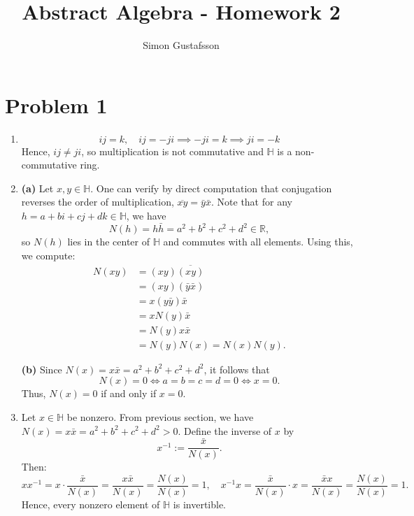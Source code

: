 \documentclass[12pt]{article}
\title{Abstract Algebra - Homework 2}
\author{Simon Gustafsson}
\date{}
\begin{document}
\maketitle

\section*{Problem 1}
\begin{enumerate}[label=(\arabic*)]
    \item    
    \[
    ij = k, \quad ij = -ji \implies -ji = k \implies ji = -k
    \]
    Hence, \( ij \neq ji \), so multiplication is not commutative and \( \mathbb{H} \) is a non-commutative ring.

    \item
    \textbf{(a)} Let \( x, y \in \mathbb{H} \). One can verify by direct computation that conjugation reverses the order of multiplication,
    \( \overline{xy} = \bar{y} \bar{x}.\)
    Note that for any \( h = a + bi + cj + dk \in \mathbb{H} \), we have
    \[
    N(h) = h\bar{h} = a^2 + b^2 + c^2 + d^2 \in \mathbb{R},
    \]
    so \( N(h) \) lies in the center of \( \mathbb{H} \) and commutes with all elements. Using this, we compute:
    \[
    \begin{aligned}
        N(xy) &= (xy)\overline{(xy)} \\
              &= (xy)(\bar{y}\bar{x}) \\
              &= x(y\bar{y})\bar{x} \\
              &= xN(y)\bar{x} \\
              &= N(y) x\bar{x} \\
              &= N(y)N(x) = N(x)N(y).
    \end{aligned}
    \]

    \textbf{(b)} Since \( N(x) = x\bar{x} = a^2 + b^2 + c^2 + d^2 \), it follows that
    \[
    N(x) = 0 \iff a = b = c = d = 0 \iff x = 0.
    \]
    Thus, \( N(x) = 0 \) if and only if \( x = 0 \).
    \item
    Let \( x \in \mathbb{H} \) be nonzero. From previous section, we have \(N(x) = x\bar{x} = a^2 + b^2 + c^2 + d^2 > 0.\)
    Define the inverse of \( x \) by
    \[
    x^{-1} := \frac{\bar{x}}{N(x)}.
    \]
    Then:
    \[
    x x^{-1} = x \cdot \frac{\bar{x}}{N(x)} = \frac{x\bar{x}}{N(x)} = \frac{N(x)}{N(x)} = 1,
    \quad
    x^{-1} x = \frac{\bar{x}}{N(x)} \cdot x = \frac{\bar{x}x}{N(x)} = \frac{N(x)}{N(x)} = 1.
    \]
    Hence, every nonzero element of \( \mathbb{H} \) is invertible.


\end{enumerate}
\end{document}
